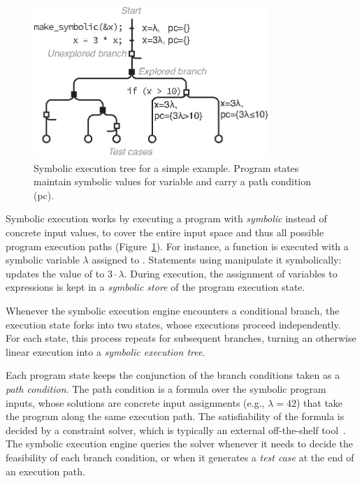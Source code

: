 \begin{figure}
  \centering
  \includegraphics[width=3.5in]{introduction/figures/symbex-tree}
  \caption{Symbolic execution tree for a simple example.  Program states maintain symbolic values for variable  and carry a path condition (pc).}
  \label{fig:intro:symbex-tree}
\end{figure}

Symbolic execution works by executing a program with \emph{symbolic} instead of concrete input values, to cover the entire input space and thus all possible program execution paths (Figure~\ref{fig:intro:symbex-tree}).  For instance, a function  is executed with a symbolic variable $\lambda$ assigned to .
%
Statements using  manipulate it symbolically:  updates the value of  to $3 \cdot \lambda$.  During execution, the assignment of variables to expressions is kept in a \emph{symbolic store} of the program execution state.

Whenever the symbolic execution engine encounters a conditional branch, the execution state forks into two states, whose executions proceed independently.  For each state, this process repeats for subsequent branches, turning an otherwise linear execution into a \emph{symbolic execution tree}.

Each program state keeps the conjunction of the branch conditions taken as a \emph{path condition}.
%
The path condition is a formula over the symbolic program inputs, whose solutions are concrete input assignments (e.g., $\lambda = 42$) that take the program along the same execution path.
%
The satisfiability of the formula is decided by a constraint solver, which is typically an external off-the-shelf tool~\cite{stp,Z3,cvc}.
%
The symbolic execution engine queries the solver whenever it needs to decide the feasibility of each branch condition, or when it generates a \emph{test case} at the end of an execution path.

